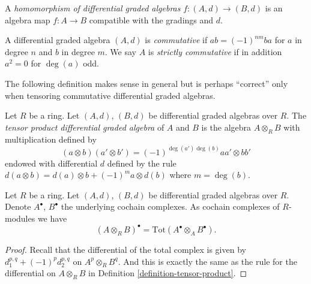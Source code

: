\begin{definition}
\label{definition-homomorphism-dga}
A {\it homomorphism of differential graded algebras}
$f : (A, d) \to (B, d)$ is an algebra map $f : A \to B$
compatible with the gradings and $d$.
\end{definition}

\begin{definition}
\label{definition-cdga}
A differential graded algebra $(A, d)$ is {\it commutative} if
$ab = (-1)^{nm}ba$ for $a$ in degree $n$ and $b$ in degree $m$.
We say $A$ is {\it strictly commutative} if in addition $a^2 = 0$
for $\deg(a)$ odd.
\end{definition}

\noindent
The following definition makes sense in general but is perhaps
``correct'' only when tensoring commutative differential graded
algebras.

\begin{definition}
\label{definition-tensor-product}
Let $R$ be a ring.
Let $(A, d)$, $(B, d)$ be differential graded algebras over $R$.
The {\it tensor product differential graded algebra} of $A$ and $B$
is the algebra $A \otimes_R B$ with multiplication defined by
$$
(a \otimes b)(a' \otimes b') = (-1)^{\deg(a')\deg(b)} aa' \otimes bb'
$$
endowed with differential $d$ defined by the rule
$d(a \otimes b) = d(a) \otimes b + (-1)^m a \otimes d(b)$
where $m = \deg(b)$.
\end{definition}

\begin{lemma}
\label{lemma-total-complex-tensor-product}
Let $R$ be a ring.
Let $(A, d)$, $(B, d)$ be differential graded algebras over $R$.
Denote $A^\bullet$, $B^\bullet$ the underlying cochain complexes.
As cochain complexes of $R$-modules we have
$$
(A \otimes_R B)^\bullet = \text{Tot}(A^\bullet \otimes_A B^\bullet).
$$
\end{lemma}

\begin{proof}
Recall that the differential of the total complex is given by
$d_1^{p, q} + (-1)^p d_2^{p, q}$ on $A^p \otimes_R B^q$.
And this is exactly the same as the rule for the differential
on $A \otimes_R B$ in
Definition \ref{definition-tensor-product}.
\end{proof}












